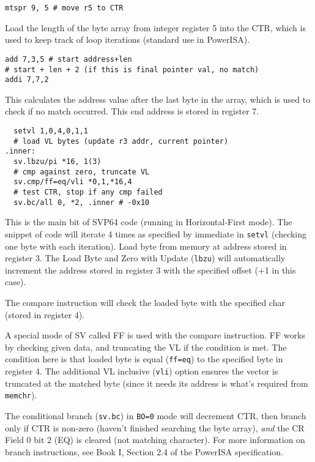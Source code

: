 \begin{verbatim}
mtspr 9, 5 # move r5 to CTR
\end{verbatim}
Load the length of the byte array from integer register 5 into
the \acrfull{CTR}, which is used to keep track of loop iterations
(standard use in PowerISA).

\begin{verbatim}
add 7,3,5 # start address+len
# start + len + 2 (if this is final pointer val, no match)
addi 7,7,2
\end{verbatim}
This calculates the address value after the last byte in the array, which is
used to check if no match occurred. This end address is stored in register 7.

\begin{verbatim}
  setvl 1,0,4,0,1,1
  # load VL bytes (update r3 addr, current pointer)
.inner:
  sv.lbzu/pi *16, 1(3)
  # cmp against zero, truncate VL
  sv.cmp/ff=eq/vli *0,1,*16,4
  # test CTR, stop if any cmp failed
  sv.bc/all 0, *2, .inner # -0x10
\end{verbatim}
This is the main bit of \acrshort{SVP64} code (running in Horizontal-First mode).
The snippet of code will iterate 4 times as specified by immediate
in \texttt{setvl} (checking one byte with each iteration).
Load byte from memory at address stored in register 3.
The Load Byte and Zero with Update (\texttt{lbzu}) will automatically increment
the address stored in register 3 with the specified offset (+1 in this case).

The compare instruction will check the loaded byte with the specified char
(stored in register 4).

A special mode of \acrfull{SV} called \acrfull{FF} is used with
the compare instruction. \acrshort{FF} works by checking given data, and truncating the
\acrfull{VL} if the condition is met. The condition here is that
loaded byte is equal (\texttt{ff=eq}) to the specified byte in register 4.
The additional \acrshort{VL} inclusive (\texttt{vli}) option ensures the vector is
truncated at the matched byte (since it needs its address is what's required
from \texttt{memchr}).

The conditional branch (\texttt{sv.bc}) in \texttt{BO=0} mode will decrement
\acrshort{CTR}, then branch only if \acrshort{CTR} is non-zero (haven't finished searching the
byte array), \textit{and} the \acrfull{CR} Field 0 bit 2 (EQ) is cleared
(not matching character). For more information on branch instructions,
see Book I, Section 2.4 of the PowerISA specification.

